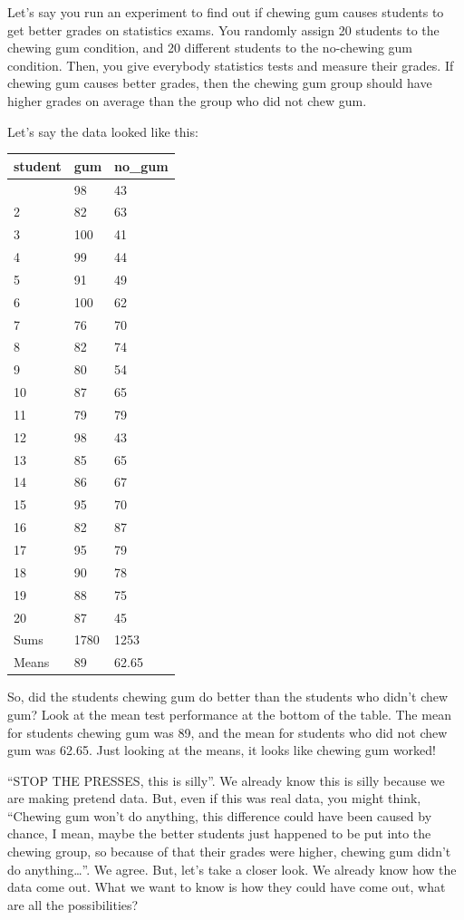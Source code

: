 \documentclass[
  letterpaper,
  DIV=11,
  numbers=noendperiod]{scrreprt}
\begin{document}
Let's say you run an experiment to find out if chewing gum causes
students to get better grades on statistics exams. You randomly assign
20 students to the chewing gum condition, and 20 different students to
the no-chewing gum condition. Then, you give everybody statistics tests
and measure their grades. If chewing gum causes better grades, then the
chewing gum group should have higher grades on average than the group
who did not chew gum.

Let's say the data looked like this:

\begin{longtable}[]{@{}lll@{}}
\toprule\noalign{}
student & gum & no\_gum \\
\midrule\noalign{}
\endhead
\bottomrule\noalign{}
\endlastfoot
1 & 98 & 43 \\
2 & 82 & 63 \\
3 & 100 & 41 \\
4 & 99 & 44 \\
5 & 91 & 49 \\
6 & 100 & 62 \\
7 & 76 & 70 \\
8 & 82 & 74 \\
9 & 80 & 54 \\
10 & 87 & 65 \\
11 & 79 & 79 \\
12 & 98 & 43 \\
13 & 85 & 65 \\
14 & 86 & 67 \\
15 & 95 & 70 \\
16 & 82 & 87 \\
17 & 95 & 79 \\
18 & 90 & 78 \\
19 & 88 & 75 \\
20 & 87 & 45 \\
Sums & 1780 & 1253 \\
Means & 89 & 62.65 \\
\end{longtable}

So, did the students chewing gum do better than the students who didn't
chew gum? Look at the mean test performance at the bottom of the table.
The mean for students chewing gum was 89, and the mean for students who
did not chew gum was 62.65. Just looking at the means, it looks like
chewing gum worked!

``STOP THE PRESSES, this is silly''. We already know this is silly
because we are making pretend data. But, even if this was real data, you
might think, ``Chewing gum won't do anything, this difference could have
been caused by chance, I mean, maybe the better students just happened
to be put into the chewing group, so because of that their grades were
higher, chewing gum didn't do anything\ldots{}''. We agree. But, let's
take a closer look. We already know how the data come out. What we want
to know is how they could have come out, what are all the possibilities?
\end{document}
